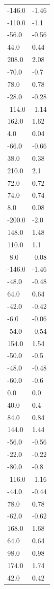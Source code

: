\begin{longtable}{ll}
-146.0 & -1.46 \\
-110.0 & -1.1 \\
-56.0 & -0.56 \\
44.0 & 0.44 \\
208.0 & 2.08 \\
-70.0 & -0.7 \\
78.0 & 0.78 \\
-28.0 & -0.28 \\
-114.0 & -1.14 \\
162.0 & 1.62 \\
4.0 & 0.04 \\
-66.0 & -0.66 \\
38.0 & 0.38 \\
210.0 & 2.1 \\
72.0 & 0.72 \\
74.0 & 0.74 \\
8.0 & 0.08 \\
-200.0 & -2.0 \\
148.0 & 1.48 \\
110.0 & 1.1 \\
-8.0 & -0.08 \\
-146.0 & -1.46 \\
-48.0 & -0.48 \\
64.0 & 0.64 \\
-42.0 & -0.42 \\
-6.0 & -0.06 \\
-54.0 & -0.54 \\
154.0 & 1.54 \\
-50.0 & -0.5 \\
-48.0 & -0.48 \\
-60.0 & -0.6 \\
0.0 & 0.0 \\
40.0 & 0.4 \\
84.0 & 0.84 \\
144.0 & 1.44 \\
-56.0 & -0.56 \\
-22.0 & -0.22 \\
-80.0 & -0.8 \\
-116.0 & -1.16 \\
-44.0 & -0.44 \\
78.0 & 0.78 \\
-62.0 & -0.62 \\
168.0 & 1.68 \\
64.0 & 0.64 \\
98.0 & 0.98 \\
174.0 & 1.74 \\
42.0 & 0.42 \\

\end{longtable}
